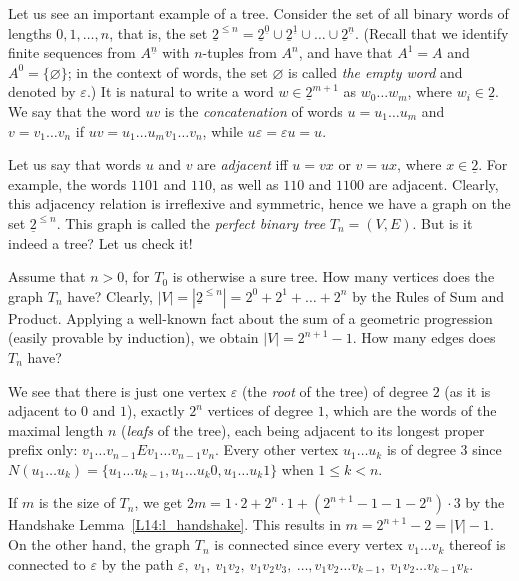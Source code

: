 \documentclass[12pt,notitlepage]{article}
\theoremstyle{plain}
\theoremstyle{definition}
\theoremstyle{plain}
\newcommand{\void}{\varnothing}
\newcommand{\eps}{\varepsilon}
\newcommand{\ul}[1]{\underline{#1}}
\newcommand{\1}{\mathbf{1}}
\newcommand{\0}{\mathbf{0}}
\begin{document}
Let us see an important example of a tree. Consider the set of all binary words of lengths $0, 1, \ldots, n$, that is, the set $\ul{2}^{\leq n} = \ul{2}^{\ul{0}} \cup \ul{2}^{\ul{1}} \cup \ldots \cup \ul{2}^{\ul{n}}$. (Recall that we identify finite sequences from $A^{\ul{n}}$ with $n$-tuples from $A^n$, and have that $A^1 = A$ and $A^0 = \{ \void \}$; in the context of words, the set $\void$ is called \emph{the empty word} and denoted by $\eps$.) It is natural to write a word $w \in \ul{2}^{m+1}$ as $w_0\ldots w_m$, where $w_i \in \ul{2}$. We say that the word $u v$ is the \emph{concatenation} of words $u = u_1 \ldots u_m$ and $v = v_1 \ldots v_n$ if $u v = u_1 \ldots u_m v_1 \ldots v_n$, while $u \eps = \eps u = u$.

Let us say that words $u$ and $v$ are \emph{adjacent} iff $u = v x$ or $v = u x$, where $x \in \ul{2}$. For example, the words $1101$ and $110$, as well as $110$ and $1100$ are adjacent. Clearly, this adjacency relation is irreflexive and symmetric, hence we have a graph on the set $\ul{2}^{\leq n}$. This graph is called the \emph{perfect binary tree} $T_n = (V, E)$. But is it indeed a tree? Let us check it!

Assume that $n > 0$, for $T_0$ is otherwise a sure tree. How many vertices does the graph $T_n$ have? Clearly, $|V| = |\ul{2}^{\leq n}| = 2^0 + 2^1 + \ldots + 2^n$ by the Rules of Sum and Product. Applying a well-known fact about the sum of a geometric progression (easily provable by induction), we obtain $|V| = 2^{n+1} - 1$. How many edges does $T_n$ have?

We see that there is just one vertex $\eps$ (the \emph{root} of the tree) of degree $2$ (as it is adjacent to $0$ and $1$), exactly $2^n$ vertices of degree $1$, which are the words of the maximal length $n$ (\emph{leafs} of the tree), each being adjacent to its longest proper prefix only: $v_1 \ldots v_{n - 1} E v_1 \ldots v_{n - 1} v_n$. Every other vertex $u_1 \ldots u_k$ is of degree $3$ since $N(u_1 \ldots u_k) = \{u_1 \ldots u_{k-1}, u_1 \ldots u_k 0, u_1 \ldots u_k 1\}$ when $1 \leq k < n$.

If $m$ is the size of $T_n$, we get $2 m = 1 \cdot 2 + 2^n \cdot 1 + (2^{n + 1} - 1 - 1 - 2^n) \cdot 3$ by the Handshake Lemma~\ref{L14:l_handshake}. This results in $m = 2^{n + 1} - 2 = |V| - 1$. On the other hand, the graph $T_n$ is connected since every vertex $v_1 \ldots v_k$ thereof is connected to $\eps$ by the path 
$\eps,\ v_1,\ v_1 v_2,\ v_1 v_2 v_3,\ \ldots, v_1 v_2 \ldots v_{k-1},\  v_1 v_2 \ldots v_{k-1} v_k$.
\end{document}

